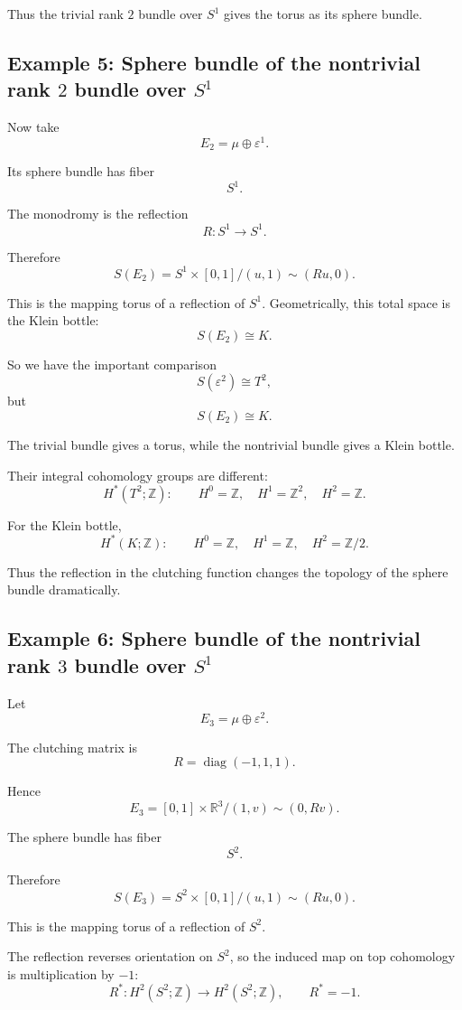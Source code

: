 \documentclass[12pt,a4paper]{article}
\theoremstyle{notespace}
\begin{document}
Thus the trivial rank \(2\) bundle over \(S^1\) gives the torus as its sphere bundle.

\subsection{Example 5: Sphere bundle of the nontrivial rank \(2\) bundle over \(S^1\)}

Now take
\[
E_2=\mu\oplus \varepsilon^1.
\]

Its sphere bundle has fiber
\[
S^1.
\]

The monodromy is the reflection
\[
R:S^1\to S^1.
\]

Therefore
\[
S(E_2)
=
S^1\times [0,1]/(u,1)\sim(Ru,0).
\]

This is the mapping torus of a reflection of \(S^1\). Geometrically, this total space is the Klein bottle:
\[
\boxed{
	S(E_2)\cong K.
}
\]

So we have the important comparison
\[
S(\varepsilon^2)\cong T^2,
\]
but
\[
S(E_2)\cong K.
\]

The trivial bundle gives a torus, while the nontrivial bundle gives a Klein bottle.

Their integral cohomology groups are different:
\[
H^*(T^2;\mathbb{Z}):
\qquad
H^0=\mathbb{Z},
\quad
H^1=\mathbb{Z}^2,
\quad
H^2=\mathbb{Z}.
\]

For the Klein bottle,
\[
H^*(K;\mathbb{Z}):
\qquad
H^0=\mathbb{Z},
\quad
H^1=\mathbb{Z},
\quad
H^2=\mathbb{Z}/2.
\]

Thus the reflection in the clutching function changes the topology of the sphere bundle dramatically.

\subsection{Example 6: Sphere bundle of the nontrivial rank \(3\) bundle over \(S^1\)}

Let
\[
E_3=\mu\oplus \varepsilon^2.
\]

The clutching matrix is
\[
R=\operatorname{diag}(-1,1,1).
\]

Hence
\[
E_3=[0,1]\times \mathbb{R}^3/(1,v)\sim(0,Rv).
\]

The sphere bundle has fiber
\[
S^2.
\]

Therefore
\[
S(E_3)=S^2\times [0,1]/(u,1)\sim(Ru,0).
\]

This is the mapping torus of a reflection of \(S^2\).

The reflection reverses orientation on \(S^2\), so the induced map on top cohomology is multiplication by \(-1\):
\[
R^*:H^2(S^2;\mathbb{Z})\to H^2(S^2;\mathbb{Z}),
\qquad
R^*=-1.
\]
\end{document}
